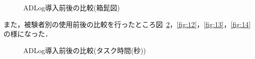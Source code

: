 \begin{figure}[hb]
	\begin{center}
		\caption{ADLog導入前後の比較(箱髭図)}
		\label{fig:10}
	\end{center}
\end{figure}

また，被験者別の使用前後の比較を行ったところ図~\ref{fig:11}，\ref{fig:12}，\ref{fig:13}，\ref{fig:14}の様になった．

\begin{figure}[hb]
	\begin{center}
		\caption{ADLog導入前後の比較(タスク時間(秒))}
		\label{fig:11}
	\end{center}
\end{figure}

